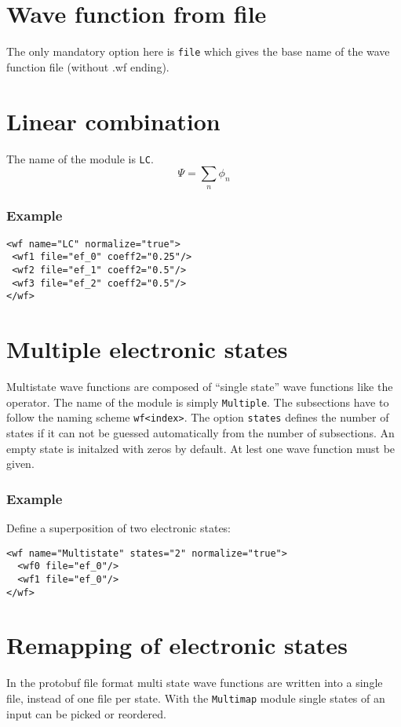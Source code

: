 \documentclass[a4paper,12pt]{scrbook}
\begin{document}
\section{Wave function from file}
The only mandatory option here is \verb|file| which gives the base name of the wave function file
(without .wf ending).

\section{Linear combination}
The name of the module is \verb|LC|.
\begin{equation}
 \Psi = \sum_n \phi_n
\end{equation}

\subsubsection*{Example}
\begin{verbatim}
<wf name="LC" normalize="true">
 <wf1 file="ef_0" coeff2="0.25"/>
 <wf2 file="ef_1" coeff2="0.5"/>
 <wf3 file="ef_2" coeff2="0.5"/>
</wf>
\end{verbatim}


\section{Multiple electronic states}
\label{sec:WFMultistate}

Multistate wave functions are composed of ``single state'' wave functions like the operator.
The name of the module is simply \verb|Multiple|. The subsections have to follow the naming
scheme \verb|wf<index>|. The option \verb|states| defines the number of states if it can not
be guessed automatically from the number of subsections. An empty state is initalzed with zeros
by default. At lest one wave function must be given.

\subsubsection*{Example}
Define a superposition of two electronic states:
\begin{verbatim}
<wf name="Multistate" states="2" normalize="true">
  <wf0 file="ef_0"/>
  <wf1 file="ef_0"/>
</wf>
\end{verbatim}

\section{Remapping of electronic states}
In the protobuf file format multi state wave functions are written into a single file,
instead of one file per state. With the \verb|Multimap| module single states of an input 
can be picked or reordered.
\end{document}
